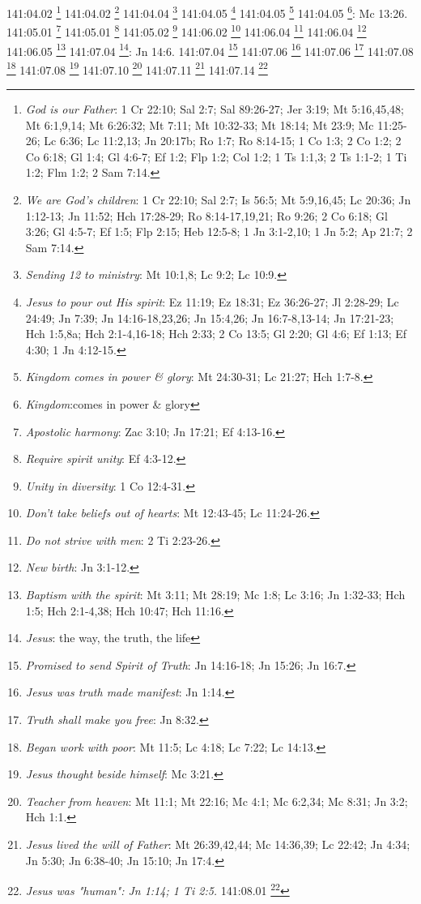 {{{{{{{{{{{{{{{{{{{{{{{{{{{{141:04.02 \footnote{\textit{God is our Father}: 1 Cr 22:10; Sal 2:7; Sal 89:26-27; Jer 3:19; Mt 5:16,45,48; Mt 6:1,9,14; Mt 6:26:32; Mt 7:11; Mt 10:32-33; Mt 18:14; Mt 23:9; Mc 11:25-26; Lc 6:36; Lc 11:2,13; Jn 20:17b; Ro 1:7; Ro 8:14-15; 1 Co 1:3; 2 Co 1:2; 2 Co 6:18; Gl 1:4; Gl 4:6-7; Ef 1:2; Flp 1:2; Col 1:2; 1 Ts 1:1,3; 2 Ts 1:1-2; 1 Ti 1:2; Flm 1:2; 2 Sam 7:14.}
141:04.02 \footnote{\textit{We are God's children}: 1 Cr 22:10; Sal 2:7; Is 56:5; Mt 5:9,16,45; Lc 20:36; Jn 1:12-13; Jn 11:52; Hch 17:28-29; Ro 8:14-17,19,21; Ro 9:26; 2 Co 6:18; Gl 3:26; Gl 4:5-7; Ef 1:5; Flp 2:15; Heb 12:5-8; 1 Jn 3:1-2,10; 1 Jn 5:2; Ap 21:7; 2 Sam 7:14.}
141:04.04 \footnote{\textit{Sending 12 to ministry}: Mt 10:1,8; Lc 9:2; Lc 10:9.}
141:04.05 \footnote{\textit{Jesus to pour out His spirit}: Ez 11:19; Ez 18:31; Ez 36:26-27; Jl 2:28-29; Lc 24:49; Jn 7:39; Jn 14:16-18,23,26; Jn 15:4,26; Jn 16:7-8,13-14; Jn 17:21-23; Hch 1:5,8a; Hch 2:1-4,16-18; Hch 2:33; 2 Co 13:5; Gl 2:20; Gl 4:6; Ef 1:13; Ef 4:30; 1 Jn 4:12-15.}
141:04.05 \footnote{\textit{Kingdom comes in power & glory}: Mt 24:30-31; Lc 21:27; Hch 1:7-8.}
141:04.05 \footnote{\textit{Kingdom}:comes in power & glory}: Mc 13:26.}
141:05.01 \footnote{\textit{Apostolic harmony}: Zac 3:10; Jn 17:21; Ef 4:13-16.}
141:05.01 \footnote{\textit{Require spirit unity}: Ef 4:3-12.}
141:05.02 \footnote{\textit{Unity in diversity}: 1 Co 12:4-31.}
141:06.02 \footnote{\textit{Don't take beliefs out of hearts}: Mt 12:43-45; Lc 11:24-26.}
141:06.04 \footnote{\textit{Do not strive with men}: 2 Ti 2:23-26.}
141:06.04 \footnote{\textit{New birth}: Jn 3:1-12.}
141:06.05 \footnote{\textit{Baptism with the spirit}: Mt 3:11; Mt 28:19; Mc 1:8; Lc 3:16; Jn 1:32-33; Hch 1:5; Hch 2:1-4,38; Hch 10:47; Hch 11:16.}
141:07.04 \footnote{\textit{Jesus}: the way, the truth, the life}: Jn 14:6.}
141:07.04 \footnote{\textit{Promised to send Spirit of Truth}: Jn 14:16-18; Jn 15:26; Jn 16:7.}
141:07.06 \footnote{\textit{Jesus was truth made manifest}: Jn 1:14.}
141:07.06 \footnote{\textit{Truth shall make you free}: Jn 8:32.}
141:07.08 \footnote{\textit{Began work with poor}: Mt 11:5; Lc 4:18; Lc 7:22; Lc 14:13.}
141:07.08 \footnote{\textit{Jesus thought beside himself}: Mc 3:21.}
141:07.10 \footnote{\textit{Teacher from heaven}: Mt 11:1; Mt 22:16; Mc 4:1; Mc 6:2,34; Mc 8:31; Jn 3:2; Hch 1:1.}
141:07.11 \footnote{\textit{Jesus lived the will of Father}: Mt 26:39,42,44; Mc 14:36,39; Lc 22:42; Jn 4:34; Jn 5:30; Jn 6:38-40; Jn 15:10; Jn 17:4.}
141:07.14 \footnote{\textit{Jesus was "human": Jn 1:14; 1 Ti 2:5.}
141:08.01 \footnote{\textit{Apostles ministered to sick}: Mt 10:8; Lc 10:9.}
}}}}}}}}}}}}}}}}}}}}}}}}}}}
